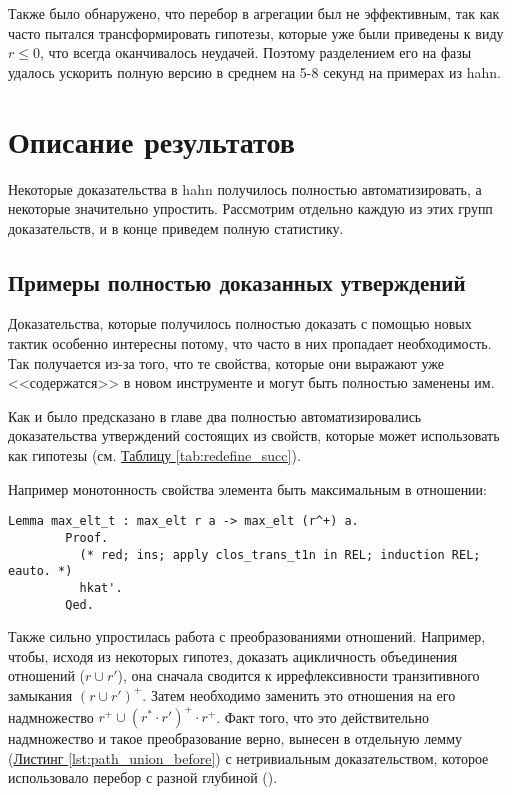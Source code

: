 \documentclass[times
              ]{itmo-student-thesis}
\begin{document}
      Также было обнаружено, что перебор в агрегации был не эффективным, так как часто пытался
      трансформировать гипотезы, которые уже были приведены к виду $r \le 0$, что всегда оканчивалось
      неудачей. Поэтому разделением его на фазы удалось ускорить полную версию  в среднем на
      5-8 секунд на примерах из hahn.


  \section{Описание результатов}

    Некоторые доказательства в hahn получилось полностью автоматизировать, а некоторые значительно
    упростить. Рассмотрим отдельно каждую из этих групп доказательств, и в конце приведем полную
    статистику.

    \subsection{Примеры полностью доказанных утверждений}

      Доказательства, которые получилось полностью доказать с помощью новых тактик особенно интересны
      потому, что часто в них пропадает необходимость. Так получается из-за того, что те свойства,
      которые они выражают уже <<содержатся>> в новом инструменте и могут быть полностью заменены им.

      Как и было предсказано в главе два полностью автоматизировались доказательства утверждений
      состоящих из свойств, которые  может использовать как гипотезы
      (см. \hyperref[tab:redefine_succ]{Таблицу \ref{tab:redefine_succ}}).

      Например монотонность свойства элемента быть максимальным в отношении:
      \begin{lstlisting}[float=false, gobble=8]
        Lemma max_elt_t : max_elt r a -> max_elt (r^+) a.
        Proof.
          (* red; ins; apply clos_trans_t1n in REL; induction REL; eauto. *)
          hkat'.
        Qed.
      \end{lstlisting}

      Также сильно упростилась работа с преобразованиями отношений.
      Например, чтобы, исходя из некоторых гипотез, доказать ацикличность объединения
      отношений ($r \cup r'$), она сначала сводится к иррефлексивности транзитивного замыкания
      $(r \cup r')^+$.
      Затем необходимо заменить это отношения на его надмножество $r^+ \cup (r^* \cdot r')^+ \cdot r^+$.
      Факт того, что это действительно надмножество и такое преобразование
      верно, вынесен в отдельную лемму  (\hyperref[lst:path_union_before]{Листинг \ref{lst:path_union_before}})
      с нетривиальным доказательством, которое использовало перебор с разной глубиной
      ().
\end{document}
